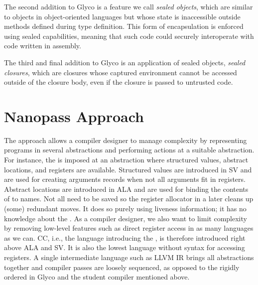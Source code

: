 \documentclass[main.tex]{subfiles}
\begin{document}
The second addition to Glyco is a feature we call \emph{sealed objects}, which are similar to objects in object-oriented languages but whose state is inaccessible outside methods defined during type definition. This form of encapsulation is enforced using sealed capabilities, meaning that such code could securely interoperate with code written in assembly.

The third and final addition to Glyco is an application of sealed objects, \emph{sealed closures}, which are closures whose captured environment cannot be accessed outside of the closure body, even if the closure is passed to untrusted code.

\section{Nanopass Approach}
The  approach allows a compiler designer to manage complexity by representing programs in several abstractions and performing actions at a suitable abstraction. For instance, the  is imposed at an abstraction where structured values, abstract locations, and registers are available. Structured values are introduced in SV and are used for creating arguments records when not all arguments fit in registers. Abstract locations are introduced in ALA and are used for binding the contents of  to names. Not all  need to be saved so the register allocator in a later  cleans up (some) redundant moves. It does so purely using liveness information; it has no knowledge about the . As a compiler designer, we also want to limit complexity by removing low-level features such as direct register access in as many languages as we can. CC, i.e., the language introducing the , is therefore introduced right above ALA and SV. It is also the lowest language without syntax for accessing registers. A single intermediate language such as LLVM IR brings all abstractions together and compiler passes are loosely sequenced, as opposed to the rigidly ordered  in Glyco and the student compiler mentioned above.
\end{document}
